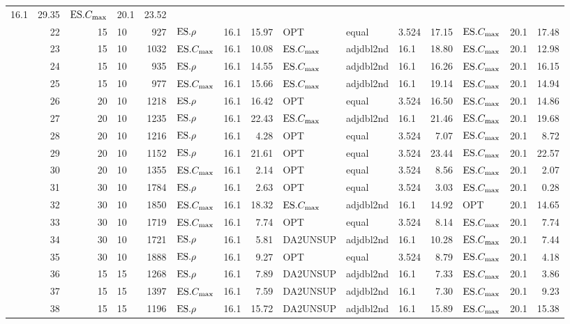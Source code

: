 {\begin{longtable}{l@{}rr@{$\times$}lr|l@{}rr|l@{ }l@{ }l@{ }r|l@{ }l@{ }r}
16.1 & 29.35 & $\text{ES}.{C_{\max}}$ & 20.1 & 23.52 \\ 
&22 & 15&10 & 927 & $\text{ES}.{\rho}$ & 16.1 & 15.97 & OPT & equal & 3.524 & 
17.15 & $\text{ES}.{C_{\max}}$ & 20.1 & 17.48 \\ 
&23 & 15&10 & 1032 & $\text{ES}.{C_{\max}}$ & 16.1 & 10.08 & $\text{ES}.{C_{\max}}$ & adjdbl2nd & 
16.1 & 18.80 & $\text{ES}.{C_{\max}}$ & 20.1 & 12.98 \\ 
&24 & 15&10 & 935 & $\text{ES}.{\rho}$ & 16.1 & 14.55 & $\text{ES}.{C_{\max}}$ & adjdbl2nd & 
16.1 & 16.26 & $\text{ES}.{C_{\max}}$ & 20.1 & 16.15 \\ 
&25 & 15&10 & 977 & $\text{ES}.{C_{\max}}$ & 16.1 & 15.66 & $\text{ES}.{C_{\max}}$ & adjdbl2nd & 
16.1 & 19.14 & $\text{ES}.{C_{\max}}$ & 20.1 & 14.94 \\ 
&26 & 20&10 & 1218 & $\text{ES}.{\rho}$ & 16.1 & 16.42 & OPT & equal & 3.524 & 
16.50 & $\text{ES}.{C_{\max}}$ & 20.1 & 14.86 \\ 
&27 & 20&10 & 1235 & $\text{ES}.{\rho}$ & 16.1 & 22.43 & $\text{ES}.{C_{\max}}$ & adjdbl2nd & 
16.1 & 21.46 & $\text{ES}.{C_{\max}}$ & 20.1 & 19.68 \\ 
&28 & 20&10 & 1216 & $\text{ES}.{\rho}$ & 16.1 & 4.28 & OPT & equal & 3.524 & 7.07 
& $\text{ES}.{C_{\max}}$ & 20.1 & 8.72 \\ 
&29 & 20&10 & 1152 & $\text{ES}.{\rho}$ & 16.1 & 21.61 & OPT & equal & 3.524 & 
23.44 & $\text{ES}.{C_{\max}}$ & 20.1 & 22.57 \\ 
&30 & 20&10 & 1355 & $\text{ES}.{C_{\max}}$ & 16.1 & 2.14 & OPT & equal & 3.524 & 
8.56 & $\text{ES}.{C_{\max}}$ & 20.1 & 2.07 \\ 
&31 & 30&10 & 1784 & $\text{ES}.{\rho}$ & 16.1 & 2.63 & OPT & equal & 3.524 & 3.03 
& $\text{ES}.{C_{\max}}$ & 20.1 & 0.28 \\ 
&32 & 30&10 & 1850 & $\text{ES}.{C_{\max}}$ & 16.1 & 18.32 & $\text{ES}.{C_{\max}}$ & adjdbl2nd & 
16.1 & 14.92 & OPT & 20.1 & 14.65 \\ 
&33 & 30&10 & 1719 & $\text{ES}.{C_{\max}}$ & 16.1 & 7.74 & OPT & equal & 3.524 & 
8.14 & $\text{ES}.{C_{\max}}$ & 20.1 & 7.74 \\ 
&34 & 30&10 & 1721 & $\text{ES}.{\rho}$ & 16.1 & 5.81 & DA2UNSUP & adjdbl2nd & 
16.1 & 10.28 & $\text{ES}.{C_{\max}}$ & 20.1 & 7.44 \\ 
&35 & 30&10 & 1888 & $\text{ES}.{\rho}$ & 16.1 & 9.27 & OPT & equal & 3.524 & 8.79 
& $\text{ES}.{C_{\max}}$ & 20.1 & 4.18 \\ 
&36 & 15&15 & 1268 & $\text{ES}.{\rho}$ & 16.1 & 7.89 & DA2UNSUP & adjdbl2nd & 
16.1 & 7.33 & $\text{ES}.{C_{\max}}$ & 20.1 & 3.86 \\ 
&37 & 15&15 & 1397 & $\text{ES}.{C_{\max}}$ & 16.1 & 7.59 & DA2UNSUP & adjdbl2nd & 
16.1 & 7.30 & $\text{ES}.{C_{\max}}$ & 20.1 & 9.23 \\ 
&38 & 15&15 & 1196 & $\text{ES}.{\rho}$ & 16.1 & 15.72 & DA2UNSUP & adjdbl2nd & 
16.1 & 15.89 & $\text{ES}.{C_{\max}}$ & 20.1 & 15.38 \\ 

\end{longtable}}
